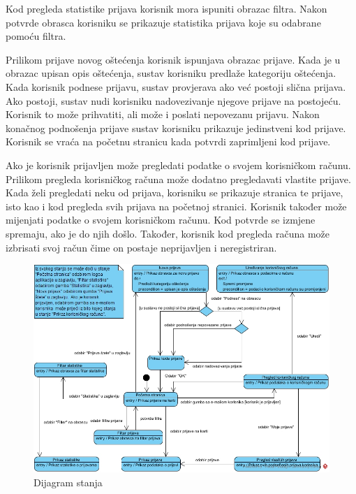 			Kod pregleda statistike prijava korisnik mora ispuniti obrazac filtra. Nakon potvrde obrasca korisniku se prikazuje statistika prijava koje su odabrane pomoću filtra. 
			
			Prilikom prijave novog oštećenja korisnik ispunjava obrazac prijave. Kada je u obrazac upisan opis oštećenja, sustav korisniku predlaže kategoriju oštećenja. Kada korisnik podnese prijavu, sustav provjerava ako već postoji slična prijava. Ako postoji, sustav nudi korisniku nadovezivanje njegove prijave na postojeću. Korisnik to može prihvatiti, ali može i poslati nepovezanu prijavu. Nakon konačnog podnošenja prijave sustav korisniku prikazuje jedinstveni kod prijave. Korisnik se vraća na početnu stranicu kada potvrdi zaprimljeni kod prijave.
			
			Ako je korisnik prijavljen može pregledati podatke o svojem korisničkom računu. Prilikom pregleda korisničkog računa može dodatno pregledavati vlastite prijave. Kada želi pregledati neku od prijava, korisniku se prikazuje stranica te prijave, isto kao i kod pregleda svih prijava na početnoj stranici. Korisnik također može mijenjati podatke o svojem korisničkom računu. Kod potvrde se izmjene spremaju, ako je do njih došlo. Također, korisnik kod pregleda računa može izbrisati svoj račun čime on postaje neprijavljen i neregistriran.
			
			\begin{figure}[H]
				\includegraphics[width=\textwidth]{slike/dijagramStanja.jpg} %
				\caption{Dijagram stanja}
				\label{fig:dijagramStanja} %
			\end{figure}
			
